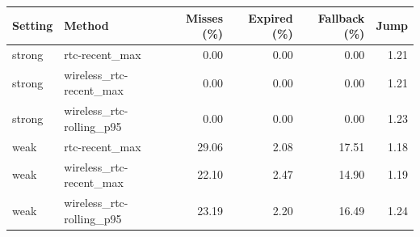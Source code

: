 \begin{tabular}{llrrrr}
\toprule
Setting & Method & Misses (\%) & Expired (\%) & Fallback (\%) & Jump \\
\midrule
strong & rtc-recent\_max & 0.00 & 0.00 & 0.00 & 1.21 \\
strong & wireless\_rtc-recent\_max & 0.00 & 0.00 & 0.00 & 1.21 \\
strong & wireless\_rtc-rolling\_p95 & 0.00 & 0.00 & 0.00 & 1.23 \\
weak & rtc-recent\_max & 29.06 & 2.08 & 17.51 & 1.18 \\
weak & wireless\_rtc-recent\_max & 22.10 & 2.47 & 14.90 & 1.19 \\
weak & wireless\_rtc-rolling\_p95 & 23.19 & 2.20 & 16.49 & 1.24 \\
\bottomrule
\end{tabular}
